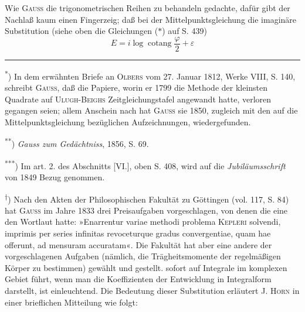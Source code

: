 \indent Wie \textsc{Gauss} die  trigonometrischen Reihen zu behandeln gedachte, dafür gibt der Nachlaß kaum einen Fingerzeig; daß bei der Mittelpunktsgleichung die imaginäre Substitution (siehe oben die Gleichungen (\(\ast\)) auf S. 439)
\begin{equation}
E=i\log\operatorname{cotang}\frac\varphi2+\varepsilon\tag*{(**)}
\end{equation}
\par\medskip\noindent\rule{.24\linewidth}{.4pt}\par\smallskip
\noindent\hspace*{\parindent}\textsuperscript{*}) In dem erwähnten Briefe an \textsc{Olbers} vom 27. Januar 1812, Werke VIII, S. 140, schreibt \textsc{Gauss}, daß die Papiere, worin er 1799 die Methode der kleinsten Quadrate auf \textsc{Ulugh-Beighs} Zeitgleichungstafel angewandt hatte, verloren gegangen seien; allem Anschein nach hat \textsc{Gauss} sie 1850, zugleich mit den auf die Mittelpunktsgleichung bezüglichen Aufzeichnungen, wiedergefunden.
\par\noindent\hspace*{\parindent}\textsuperscript{**}) \textit{Gauss zum Gedächtniss}, 1856, S. 69.
\par\noindent\hspace*{\parindent}\textsuperscript{***}) Im art. 2. des Abschnitts [VI.], oben S. 408, wird auf die \textit{Jubiläumsschrift} von 1849 Bezug genommen.
\par\noindent\hspace*{\parindent}\textsuperscript{†}) Nach den Akten der Philosophischen Fakultät zu Göttingen (vol. 117, S. 84) hat \textsc{Gauss} im Jahre 1833 drei Preisaufgaben vorgeschlagen, von denen die eine den Wortlaut hatte: »Enarrentur variae methodi problema \textsc{Kepleri} solvendi, imprimis per series infinitas revoceturque gradus convergentiae, quam hae offerunt, ad mensuram accuratam«. Die Fakultät hat aber eine andere der vorgeschlagenen Aufgaben (nämlich, die Trägheitsmomente der regelmäßigen Körper zu bestimmen) gewählt und gestellt.
\clearpage{}
\noindent sofort auf Integrale im komplexen Gebiet führt, wenn man die Koeffizienten der Entwicklung in Integralform darstellt, ist einleuchtend. Die Bedeutung dieser Substitution erläutert J. \textsc{Horn} in einer brieflichen Mitteilung wie folgt:


